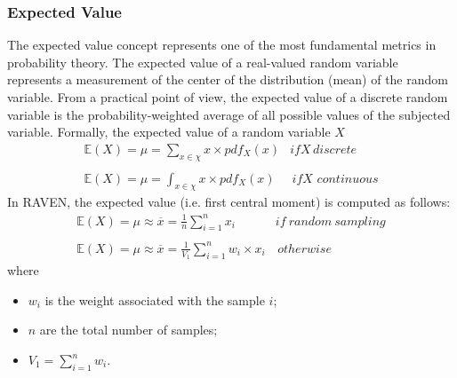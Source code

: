 \subsubsection{Expected Value}
The expected value concept represents one of the most fundamental metrics in probability theory. The expected value of a 
real-valued random variable represents a measurement of the center of the distribution (mean) of the random variable. 
From a practical point of view, the expected value of a discrete random variable is the probability-weighted average of all possible values of the subjected variable. Formally, the expected value of a random variable $X$
\begin{equation}
\begin{matrix}
\mathbb{E}(X) = \mu = \sum_{x \in \chi} x \times pdf_{X}(x) & if X \, discrete \\ 
\\ 
\mathbb{E}(X) = \mu = \int_{x \in \chi} x \times pdf_{X}(x) & \, if X \, \, continuous
\end{matrix}
\end{equation}
In RAVEN, the expected value (i.e. first central moment) is computed as follows:
\begin{equation}
\begin{matrix}
\mathbb{E}(X) = \mu \approx \overline{x} = \frac{1}{n} \sum_{i=1}^{n}  x_{i} & if \: random \: sampling \\ 
\\ 
\mathbb{E}(X) = \mu \approx \overline{x} = \frac{1}{V_{1}} \sum_{i=1}^{n} w_{i} \times x_{i}  & \, otherwise
\end{matrix}
\end{equation}
where 
\begin{itemize}
  \item $w_{i}$ is the weight associated with the sample $i$;
  \item $n$ are the total number of samples;
  \item $V_{1} = \sum_{i=1}^{n} w_{i}$.
\end{itemize}
